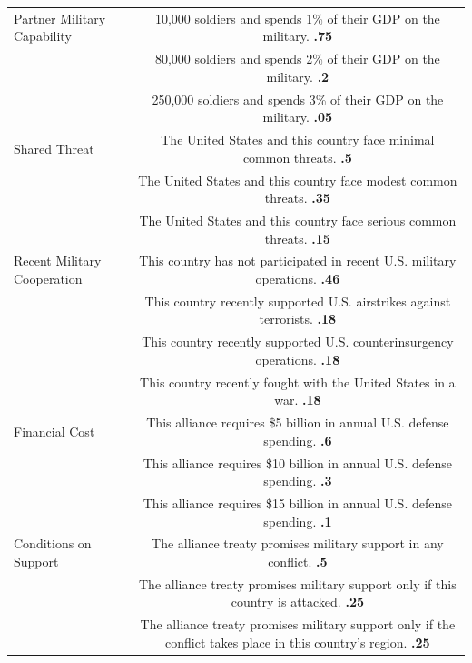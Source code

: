 \documentclass[12pt]{article}
\begin{document}
\begin{table}
\begin{adjustbox}{width = .99\textwidth}
\begin{tabular}{lc}
Partner Military Capability & 10,000 soldiers and spends 1\% of their GDP on the military. \textbf{.75}\\ %
                    & 80,000 soldiers and spends 2\% of their GDP on the military. \textbf{.2} \\ %
                    & 250,000 soldiers and spends 3\% of their GDP on the military. \textbf{.05}\\ %
                    
Shared Threat       & The United States and this country face minimal common threats. \textbf{.5} \\ 
                    & The United States and this country face modest common threats. \textbf{.35} \\
                    & The United States and this country face serious common threats. \textbf{.15} \\
Recent Military Cooperation  & This country has not participated in recent U.S. military operations. \textbf{.46} \\ 
                    & This country recently supported U.S. airstrikes against terrorists. \textbf{.18}\\
                    & This country recently supported U.S. counterinsurgency operations. \textbf{.18}\\
                    & This country recently fought with the United States in a war. \textbf{.18}\\
                    
Financial Cost      & This alliance requires \$5 billion in annual U.S. defense spending.  \textbf{.6}\\ 
                    & This alliance requires \$10 billion in annual U.S. defense spending.  \textbf{.3}\\ 
                    & This alliance requires \$15 billion in annual U.S. defense spending.  \textbf{.1}\\ 
                    
Conditions on Support  & The alliance treaty promises military support in any conflict. \textbf{.5} \\ 
                    & The alliance treaty promises military support only if this country is attacked. \textbf{.25} \\ 
                    & The alliance treaty promises military support only if the conflict takes place in this country's region. \textbf{.25} \\
                    

\end{tabular}
\end{adjustbox}
\end{table}
\end{document}
